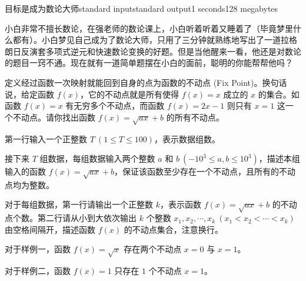 \begin{problem}{目标是成为数论大师}{standard input}{standard output}{1 seconds}{128 megabytes}

    小白非常不擅长数论，在强老师的数论课上，小白听着听着又睡着了（毕竟梦里什么都有）。小白梦见自己成为了数论大师，只用了三分钟就熟练地写出了一道拉格朗日反演套多项式逆元和快速数论变换的好题。但是当他醒来一看，他还是对数论的题目一窍不通。现在就有一道简单题摆在小白的面前，聪明的你能帮帮他吗？

    定义经过函数一次映射就能回到自身的点为函数的不动点 (Fix Point)。换句话说，给定函数 $f(x)$，它的不动点就是所有使得 $f(x)=x$ 成立的 $x$ 的集合。如函数 $f(x)=x$ 有无穷多个不动点，而函数 $f(x)=2x-1$ 则只有 $x=1$ 这一个不动点。请你找出函数 $f(x)=\sqrt{ax}+b$ 的所有不动点。

    \InputFile
    
    第一行输入一个正整数 $T\ (1\le T\le 100)$，表示数据组数。

    接下来 $T$ 组数据，每组数据输入两个整数 $a$ 和 $b\ (-10^3\le a,b\le 10^3)$，描述本组输入的函数 $f(x)=\sqrt{ax}+b$，保证该函数至少存在一个不动点，且所有的不动点均为整数。
    
    \OutputFile
    
    对于每组数据，第一行请输出一个正整数 $k$，表示函数 $f(x)=\sqrt{ax}+b$ 的不动点个数。第二行请从小到大依次输出 $k$ 个整数 $x_1,x_2,\cdots ,x_k\ (x_1<x_2<\cdots <x_k)$ 由空格间隔开，描述函数 $f(x)$ 的不动点集合，注意换行。
    
    \Example
    
    \begin{example}
    \end{example}

    \Note
    对于样例一，函数 $f(x)=\sqrt{x}$ 存在两个不动点 $x=0$ 与 $x=1$。

    对于样例二，函数 $f(x)=1$ 只存在 $1$ 个不动点 $x=1$。

\end{problem}